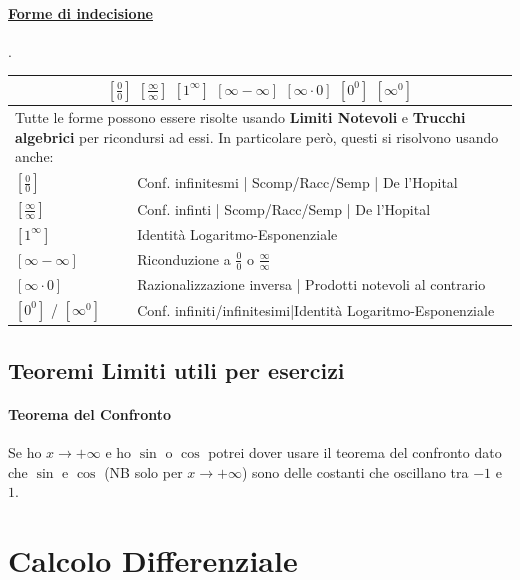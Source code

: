 \documentclass[12pt, a4paper]{article}
\begin{document}
\paragraph*{\underline{Forme di indecisione}}.\\
\begin{tabularx}{\textwidth}{|l|X|}
	\hline
	\multicolumn{2}{|c|}{
		$[\frac{0}{0}]$ $[\frac{\infty}{\infty}]$ $[1^\infty]$ $[\infty - \infty]$ $[\infty \cdot 0]$ $[0^0]$ $[\infty^0]$
	}                                                                                       \\
	\hline
	\multicolumn{2}{|X|}{
		\small{Tutte le forme possono essere risolte usando \textbf{Limiti Notevoli} e \textbf{Trucchi algebrici} per ricondursi ad essi.
			In particolare però, questi si risolvono usando anche:}
	}                                                                                       \\
	\hline
	$[\frac{0}{0}]$           & Conf. infinitesmi | Scomp/Racc/Semp | De l'Hopital          \\
	\hline
	$[\frac{\infty}{\infty}]$ & Conf. infinti | Scomp/Racc/Semp | De l'Hopital              \\
	\hline
	$[1^\infty]$              & Identità Logaritmo-Esponenziale                             \\
	\hline
	$[\infty - \infty]$       & Riconduzione a $\frac{0}{0}$ o $\frac{\infty}{\infty}$      \\
	\hline
	$[\infty \cdot 0]$        & Razionalizzazione inversa | Prodotti notevoli al contrario  \\
	\hline
	$[0^0]$ / $[\infty^0]$    & Conf. infiniti/infinitesimi|Identità Logaritmo-Esponenziale \\
	\hline
\end{tabularx}

\subsection*{Teoremi Limiti utili per esercizi}
\paragraph*{Teorema del Confronto} Se ho $x \rightarrow +\infty$ e ho $\sin$ o  $\cos$ potrei dover usare
il teorema del confronto dato che $\sin$ e $\cos$ (NB solo per $x \rightarrow +\infty$) 
sono delle costanti che oscillano tra $-1$ e $1$.


\section*{Calcolo Differenziale}
\end{document}
